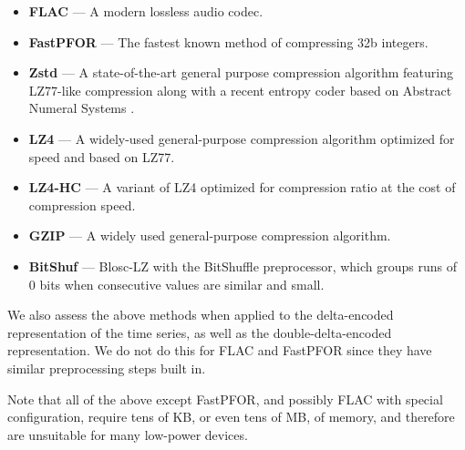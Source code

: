 \begin{itemize}[leftmargin=4mm]
\item \textbf{FLAC} \cite{flac} --- A modern lossless audio codec.
\item \textbf{FastPFOR} \cite{fastPFOR} --- The fastest known method of compressing 32b integers.
\item \textbf{Zstd} \cite{Zstd} --- A state-of-the-art general purpose compression algorithm featuring LZ77-like compression along with a recent entropy coder \cite{fbe} based on Abstract Numeral Systems \cite{ans}.
\item \textbf{LZ4} \cite{lz4} --- A widely-used general-purpose compression algorithm optimized for speed and based on LZ77.
\item \textbf{LZ4-HC} \cite{lz4} --- A variant of LZ4 optimized for compression ratio at the cost of compression speed.
\item \textbf{GZIP} \cite{gzip} --- A widely used general-purpose compression algorithm.
\item \textbf{BitShuf} \cite{blosc} --- Blosc-LZ with the BitShuffle preprocessor, which groups runs of 0 bits when consecutive values are similar and small.
\end{itemize}

We also assess the above methods when applied to the delta-encoded representation of the time series, as well as the double-delta-encoded representation. We do not do this for FLAC and FastPFOR since they have similar preprocessing steps built in.

Note that all of the above except FastPFOR, and possibly FLAC with special configuration, require tens of KB, or even tens of MB, of memory, and therefore are unsuitable for many low-power devices.

